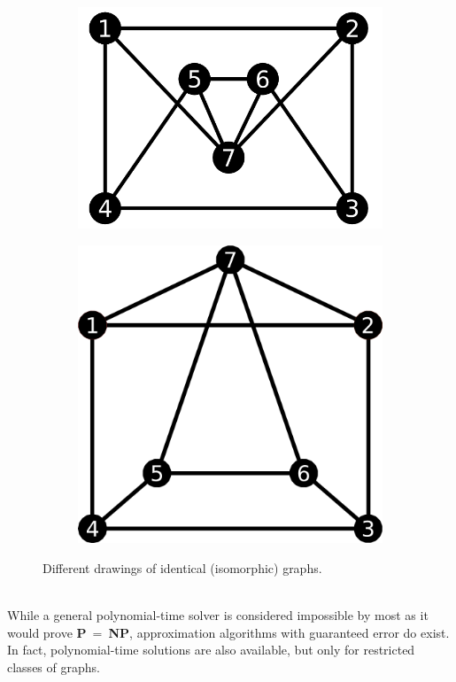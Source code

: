 \documentclass[11pt]{article}
\begin{document}
\begin{figure}[h!]
  \centering
  \begin{subfigure}{.5\textwidth}
    \centering
    \includegraphics[width=.65\linewidth]{graphA}
    \caption{}
    \label{fig:graphA}
  \end{subfigure}%
  \begin{subfigure}{.5\textwidth}
    \centering
    \includegraphics[width=.65\linewidth]{graphB}
    \caption{}
    \label{fig:graphB}
  \end{subfigure}%
  \caption{Different drawings of identical (isomorphic) graphs.}
  \label{fig:isoGraphs}
\end{figure}
\vspace{1mm}\\
While a general polynomial-time solver is considered impossible by most as it would prove \textbf{P}$ \ = \ $\textbf{NP}, approximation algorithms with guaranteed error do exist. In fact, polynomial-time solutions are also available, but only for restricted classes of graphs.
\end{document}
